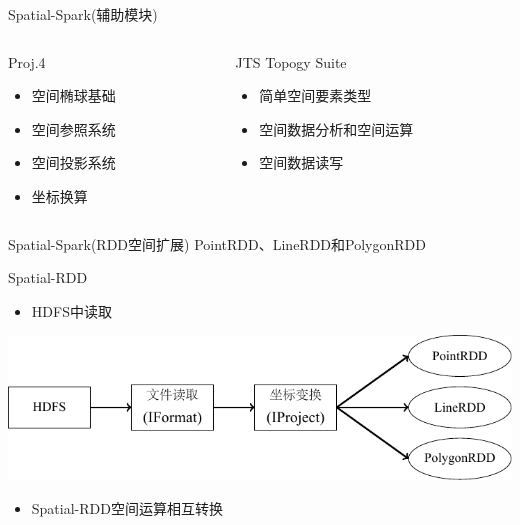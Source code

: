 \begin{frame}[t]{Spatial-Spark(辅助模块)}
    \begin{columns}
        \begin{column}{0.4 \textwidth}

            \begin{center}
            \alert{Proj.4}

            \begin{itemize}
                \item 空间椭球基础
                \item 空间参照系统
                \item 空间投影系统
                \item 坐标换算
            \end{itemize}
            \end{center}
            
        \end{column}
        \pause
        \begin{column}{0.6 \textwidth}

            \begin{center}
             \alert{JTS Topogy Suite}

                \begin{itemize}
                \item 简单空间要素类型
                \item 空间数据分析和空间运算
                \item 空间数据读写
                \end{itemize}
            \end{center}
           
        \end{column}
    \end{columns}
\end{frame}

\begin{frame}[c]{Spatial-Spark(RDD空间扩展)}
    PointRDD、LineRDD和PolygonRDD

    Spatial-RDD
    \pause
    \begin{itemize}
        \item HDFS中读取
    \end{itemize}
    \includegraphics[scale=0.8]{figures/spatialRDD.pdf}

    \pause
    \begin{itemize}
        \item Spatial-RDD空间运算相互转换
    \end{itemize}
\end{frame}

